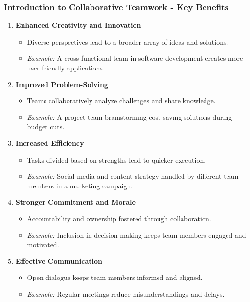 \documentclass[aspectratio=169]{beamer}
\begin{document}
\begin{frame}[fragile]
    \frametitle{Introduction to Collaborative Teamwork - Key Benefits}
    
    \begin{enumerate}
        \item \textbf{Enhanced Creativity and Innovation}
        \begin{itemize}
            \item Diverse perspectives lead to a broader array of ideas and solutions.
            \item \textit{Example:} A cross-functional team in software development creates more user-friendly applications.
        \end{itemize}
        
        \item \textbf{Improved Problem-Solving}
        \begin{itemize}
            \item Teams collaboratively analyze challenges and share knowledge.
            \item \textit{Example:} A project team brainstorming cost-saving solutions during budget cuts.
        \end{itemize}
        
        \item \textbf{Increased Efficiency}
        \begin{itemize}
            \item Tasks divided based on strengths lead to quicker execution.
            \item \textit{Example:} Social media and content strategy handled by different team members in a marketing campaign.
        \end{itemize}
        
        \item \textbf{Stronger Commitment and Morale}
        \begin{itemize}
            \item Accountability and ownership fostered through collaboration.
            \item \textit{Example:} Inclusion in decision-making keeps team members engaged and motivated.
        \end{itemize}
        
        \item \textbf{Effective Communication}
        \begin{itemize}
            \item Open dialogue keeps team members informed and aligned.
            \item \textit{Example:} Regular meetings reduce misunderstandings and delays.
        \end{itemize}
    \end{enumerate}
\end{frame}
\end{document}
